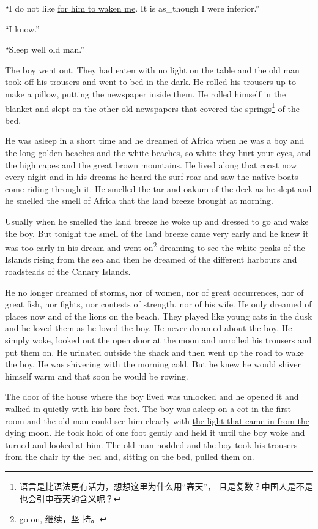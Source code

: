 \documentclass[fontset=ubuntu]{ctexrep}
\begin{document}
``I do not like \uline{for him to waken me}. It is \gls{as_though} I were \gls{inferior}.''

``I know.''

``Sleep well old man.''

The boy went out. They had eaten with no light on the table and the old man
took off his trousers and went to bed in the dark. He \gls{rolled} his
trousers up to make a \gls{pillow}, putting the newspaper inside them. He
rolled himself in the blanket and slept on the other old newspapers that
covered the springs\footnote{语言是比语法更有活力，想想这里为什么用“春天”，
  且是复数？中国人是不是也会引申春天的含义呢？} of the bed.

He was asleep in a short time and he dreamed of \gls{Africa} when he was a
boy and the long golden beaches and the white beaches, so white they hurt
your eyes, and the high capes and the great brown mountains. He lived along
that coast now every night and in his dreams he heard the \gls{surf}
\gls{roar} and saw the \gls{native} boats come riding through it. He smelled
the \gls{tar} and \gls{oakum} of the \gls{deck} as he slept and he smelled
the smell of Africa that the land breeze brought at morning.

Usually when he smelled the land breeze he woke up and dressed to go and
wake the boy. But tonight the smell of the land breeze came very early and
he knew it was too early in his dream and went on\footnote{go on, 继续，坚
  持。} dreaming to see the white peaks of the Islands rising from the sea
and then he dreamed of the different harbours and roadsteads of the Canary
Islands.

He no longer dreamed of storms, nor of women, nor of great \glspl{occurrence}, nor
of great fish, nor fights, nor contests of \gls{strength}, nor of his wife. He
only dreamed of places now and of the lions on the beach. They played like
young cats in the dusk and he loved them as he loved the boy. He never
dreamed about the boy. He simply woke, looked out the open door at the moon
and unrolled his trousers and put them on. He \gls{urinated} outside the shack and
then went up the road to wake the boy. He was shivering with the morning
cold. But he knew he would shiver himself warm and that soon he would be
rowing.

The door of the house where the boy lived was unlocked and he opened it and
walked in quietly with his \gls{bare} \gls{feet}. The boy was asleep on a
\gls{cot} in the first room and the old man could see him clearly with
\uline{the light that came in from the dying moon}. He took hold of one foot
\gls{gently} and held it until the boy woke and turned and looked at him.
The old man \gls{nodded} and the boy took his trousers from the chair by the
bed and, sitting on the bed, pulled them on.
\end{document}

